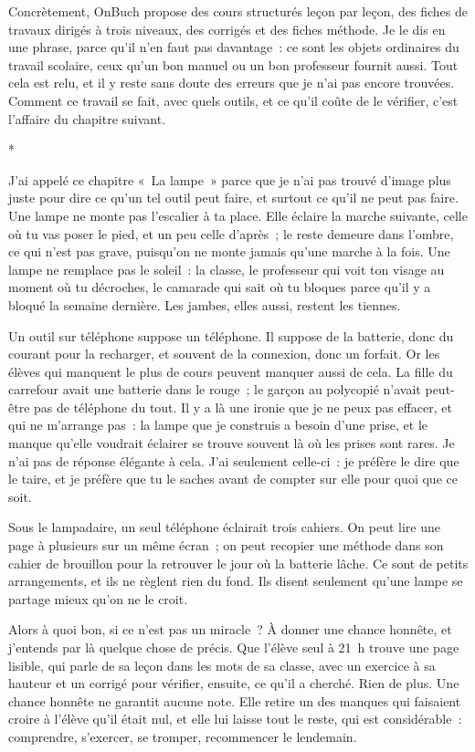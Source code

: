 \documentclass[10.5pt,twoside,openright]{book}
\newcommand{\asterisme}{\par\vspace{0.7em}\centerline{\color{gris}*\quad*\quad*}\vspace{0.7em}\par\noindent}
\begin{document}
Concrètement, OnBuch propose des cours structurés leçon par leçon, des fiches de travaux dirigés à trois niveaux, des corrigés et des fiches méthode. Je le dis en une phrase, parce qu’il n’en faut pas davantage : ce sont les objets ordinaires du travail scolaire, ceux qu’un bon manuel ou un bon professeur fournit aussi. Tout cela est relu, et il y reste sans doute des erreurs que je n’ai pas encore trouvées. Comment ce travail se fait, avec quels outils, et ce qu’il coûte de le vérifier, c’est l’affaire du chapitre suivant.

\asterisme

J’ai appelé ce chapitre « La lampe » parce que je n’ai pas trouvé d’image plus juste pour dire ce qu’un tel outil peut faire, et surtout ce qu’il ne peut pas faire. Une lampe ne monte pas l’escalier à ta place. Elle éclaire la marche suivante, celle où tu vas poser le pied, et un peu celle d’après ; le reste demeure dans l’ombre, ce qui n’est pas grave, puisqu’on ne monte jamais qu’une marche à la fois. Une lampe ne remplace pas le soleil : la classe, le professeur qui voit ton visage au moment où tu décroches, le camarade qui sait où tu bloques parce qu’il y a bloqué la semaine dernière. Les jambes, elles aussi, restent les tiennes.

Un outil sur téléphone suppose un téléphone. Il suppose de la batterie, donc du courant pour la recharger, et souvent de la connexion, donc un forfait. Or les élèves qui manquent le plus de cours peuvent manquer aussi de cela. La fille du carrefour avait une batterie dans le rouge ; le garçon au polycopié n’avait peut-être pas de téléphone du tout. Il y a là une ironie que je ne peux pas effacer, et qui ne m’arrange pas : la lampe que je construis a besoin d’une prise, et le manque qu’elle voudrait éclairer se trouve souvent là où les prises sont rares. Je n’ai pas de réponse élégante à cela. J’ai seulement celle-ci : je préfère le dire que le taire, et je préfère que tu le saches avant de compter sur elle pour quoi que ce soit.

Sous le lampadaire, un seul téléphone éclairait trois cahiers. On peut lire une page à plusieurs sur un même écran ; on peut recopier une méthode dans son cahier de brouillon pour la retrouver le jour où la batterie lâche. Ce sont de petits arrangements, et ils ne règlent rien du fond. Ils disent seulement qu’une lampe se partage mieux qu’on ne le croit.

Alors à quoi bon, si ce n’est pas un miracle ? À donner une chance honnête, et j’entends par là quelque chose de précis. Que l’élève seul à 21 h trouve une page lisible, qui parle de sa leçon dans les mots de sa classe, avec un exercice à sa hauteur et un corrigé pour vérifier, ensuite, ce qu’il a cherché. Rien de plus. Une chance honnête ne garantit aucune note. Elle retire un des manques qui faisaient croire à l’élève qu’il était nul, et elle lui laisse tout le reste, qui est considérable : comprendre, s’exercer, se tromper, recommencer le lendemain.
\end{document}
